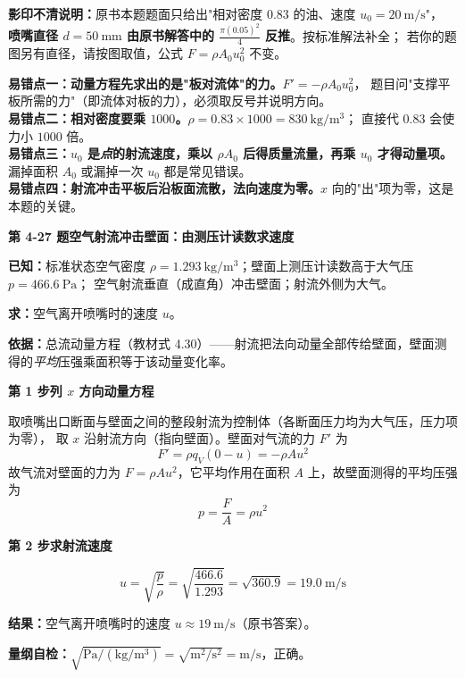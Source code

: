 \begin{tishi}
\textbf{影印不清说明：}原书本题题面只给出"相对密度 0.83 的油、速度 $u_0=20\ \mathrm{m/s}$"，
\textbf{喷嘴直径 $d=50\ \mathrm{mm}$ 由原书解答中的 $\frac{\pi(0.05)^2}{4}$ 反推}。按标准解法补全；
若你的题图另有直径，请按图取值，公式 $F=\rho A_0u_0^2$ 不变。
\end{tishi}

\begin{yicuo}
\textbf{易错点一：动量方程先求出的是"板对流体"的力。}$F'=-\rho A_0u_0^2$，
题目问"支撑平板所需的力"（即流体对板的力），必须取反号并说明方向。\\
\textbf{易错点二：相对密度要乘 $1000$。}$\rho=0.83\times1000=830\ \mathrm{kg/m^3}$；
直接代 $0.83$ 会使力小 $1000$ 倍。\\
\textbf{易错点三：$u_0$ 是\emph{点}的射流速度，乘以 $\rho A_0$ 后得质量流量，再乘 $u_0$ 才得动量项。}
漏掉面积 $A_0$ 或漏掉一次 $u_0$ 都是常见错误。\\
\textbf{易错点四：射流冲击平板后沿板面流散，法向速度为零。}$x$ 向的"出"项为零，这是本题的关键。
\end{yicuo}

\noindent\textbf{第 4-27 题\quad 空气射流冲击壁面：由测压计读数求速度}

\begin{jie}
\textbf{已知：}标准状态空气密度 $\rho=1.293\ \mathrm{kg/m^3}$；壁面上测压计读数高于大气压 $p=466.6\ \mathrm{Pa}$；
空气射流垂直（成直角）冲击壁面；射流外侧为大气。

\textbf{求：}空气离开喷嘴时的速度 $u$。

\textbf{依据：}总流动量方程（教材式 4.30）——射流把法向动量全部传给壁面，壁面测得的\emph{平均}压强乘面积等于该动量变化率。

\textbf{第 1 步\quad 列 $x$ 方向动量方程}

取喷嘴出口断面与壁面之间的整段射流为控制体（各断面压力均为大气压，压力项为零），
取 $x$ 沿射流方向（指向壁面）。壁面对气流的力 $F'$ 为
\[ F'=\rho q_V\left(0-u\right)=-\rho Au^2 \]
故气流对壁面的力为 $F=\rho Au^2$，它平均作用在面积 $A$ 上，故壁面测得的平均压强为
\[ p=\frac{F}{A}=\rho u^2 \]

\textbf{第 2 步\quad 求射流速度}

\[ u=\sqrt{\frac{p}{\rho}}=\sqrt{\frac{466.6}{1.293}}=\sqrt{360.9}=19.0\ \mathrm{m/s} \]

\textbf{结果：}空气离开喷嘴时的速度 $u\approx19\ \mathrm{m/s}$（原书答案）。

\textbf{量纲自检：}$\sqrt{\mathrm{Pa/(kg/m^3)}}=\sqrt{\mathrm{m^2/s^2}}=\mathrm{m/s}$，正确。
\end{jie}

